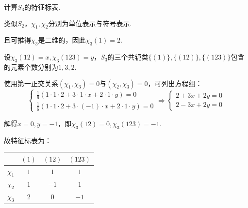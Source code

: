 \begin{instance}
    计算$S_3$的特征标表.\par
    类似$S_2$，$\chi_1,\chi_2$分别为单位表示与符号表示.\par
    且可推得$\chi_3$是二维的，因此$\chi_3(1)=2$.\par
    设$\chi_3(12)=x, \chi_3(123)=y$，$S_3$的三个共轭类$\{(1)\}, \{(12)\}, \{(123)\}$包含的元素个数分别为$1,3,2$.\par
    使用第一正交关系$(\chi_1,\chi_3)=0$与$(\chi_2,\chi_3)=0$，可列出方程组：
    \[ \begin{cases}
        \frac{1}{6}(1\cdot 1\cdot 2 + 3\cdot 1\cdot x + 2\cdot 1\cdot y) = 0 \\[7pt]
        \frac{1}{6}(1\cdot 1\cdot 2 + 3\cdot (-1)\cdot x + 2\cdot 1\cdot y) = 0
    \end{cases} \Rightarrow \begin{cases}
        2 + 3x + 2y = 0 \\
        2 - 3x + 2y = 0
    \end{cases} \]\par
    解得$x=0, y=-1$，即$\chi_3(12)=0, \chi_3(123)=-1$.\par
    故特征标表为：
    \begin{center}
        \begin{tabular}{c|ccc}
                     & $(1)$ & $(12)$ & $(123)$ \\ \hline
            $\chi_1$ & $1$   & $1$    & $1$     \\
            $\chi_2$ & $1$   & $-1$   & $1$     \\
            $\chi_3$ & $2$   & $0$    & $-1$
        \end{tabular}
    \end{center}
\end{instance}
